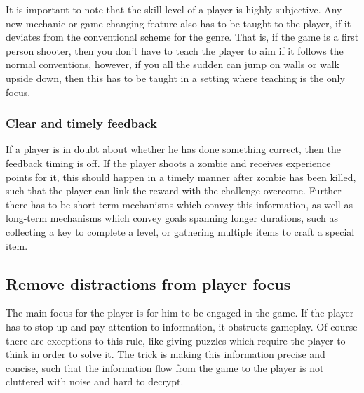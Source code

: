 It is important to note that the skill level of a player is highly subjective.
Any new mechanic or game changing feature also has to be taught to the player, if it deviates from the conventional scheme for the genre. 
That is, if the game is a first person shooter, then you don't have to teach the player to aim if it follows the normal conventions, however, if you all the sudden can jump on walls or walk upside down, then this has to be taught in a setting where teaching is the only focus.

\subsubsection{Clear and timely feedback}
If a player is in doubt about whether he has done something correct, then the feedback timing is off.
If the player shoots a zombie and receives experience points for it, this should happen in a timely manner after zombie has been killed, such that the player can link the reward with the challenge overcome.
Further there has to be short-term mechanisms which convey this information, as well as long-term mechanisms which convey goals spanning longer durations,
such as collecting a key to complete a level, or gathering multiple items to craft a special item.

\subsection{Remove distractions from player focus}
The main focus for the player is for him to be engaged in the game.
If the player has to stop up and pay attention to information, it obstructs gameplay.
Of course there are exceptions to this rule, like giving puzzles which require the player to think in order to solve it.
The trick is making this information precise and concise, such that the information flow from the game to the player is not cluttered with noise and hard to decrypt.
